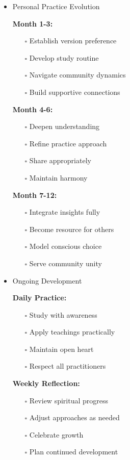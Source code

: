 \documentclass[11pt,twoside]{book}
\begin{document}
\begin{itemize}
\item Personal Practice Evolution
\label{sec:org999909a}

\textbf{\textbf{Month 1-3:}}
\begin{itemize}
\item[{$\square$}] Establish version preference
\item[{$\square$}] Develop study routine
\item[{$\square$}] Navigate community dynamics
\item[{$\square$}] Build supportive connections
\end{itemize}

\textbf{\textbf{Month 4-6:}}
\begin{itemize}
\item[{$\square$}] Deepen understanding
\item[{$\square$}] Refine practice approach
\item[{$\square$}] Share appropriately
\item[{$\square$}] Maintain harmony
\end{itemize}

\textbf{\textbf{Month 7-12:}}
\begin{itemize}
\item[{$\square$}] Integrate insights fully
\item[{$\square$}] Become resource for others
\item[{$\square$}] Model conscious choice
\item[{$\square$}] Serve community unity
\end{itemize}
\item Ongoing Development
\label{sec:org1d37c7b}

\textbf{\textbf{Daily Practice:}}
\begin{itemize}
\item[{$\square$}] Study with awareness
\item[{$\square$}] Apply teachings practically
\item[{$\square$}] Maintain open heart
\item[{$\square$}] Respect all practitioners
\end{itemize}

\textbf{\textbf{Weekly Reflection:}}
\begin{itemize}
\item[{$\square$}] Review spiritual progress
\item[{$\square$}] Adjust approaches as needed
\item[{$\square$}] Celebrate growth
\item[{$\square$}] Plan continued development
\end{itemize}


\end{itemize}
\end{document}

